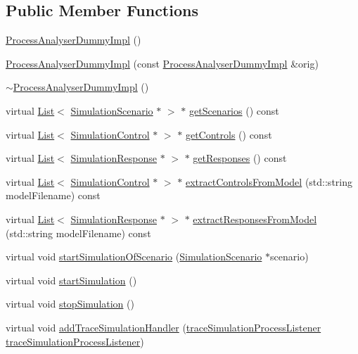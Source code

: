 \subsection*{Public Member Functions}
\begin{DoxyCompactItemize}
\item 
\hyperlink{class_process_analyser_dummy_impl_a5db24b827b7a48066deffe5229b74a32}{Process\+Analyser\+Dummy\+Impl} ()
\item 
\hyperlink{class_process_analyser_dummy_impl_a7157c55cb39b5aaab4c3f00bf3fcc347}{Process\+Analyser\+Dummy\+Impl} (const \hyperlink{class_process_analyser_dummy_impl}{Process\+Analyser\+Dummy\+Impl} \&orig)
\item 
\hyperlink{class_process_analyser_dummy_impl_aea9c62c96a8e1eb12568df16667db33e}{$\sim$\+Process\+Analyser\+Dummy\+Impl} ()
\item 
virtual \hyperlink{class_list}{List}$<$ \hyperlink{class_simulation_scenario}{Simulation\+Scenario} $\ast$ $>$ $\ast$ \hyperlink{class_process_analyser_dummy_impl_a9a91a2a398e58850f53a708a6a9d5fcf}{get\+Scenarios} () const 
\item 
virtual \hyperlink{class_list}{List}$<$ \hyperlink{class_simulation_control}{Simulation\+Control} $\ast$ $>$ $\ast$ \hyperlink{class_process_analyser_dummy_impl_ac1fd3d1c3329056a269594647a8a5d8d}{get\+Controls} () const 
\item 
virtual \hyperlink{class_list}{List}$<$ \hyperlink{class_simulation_response}{Simulation\+Response} $\ast$ $>$ $\ast$ \hyperlink{class_process_analyser_dummy_impl_a2200ea0a092a988ea550ef6c6a2abaef}{get\+Responses} () const 
\item 
virtual \hyperlink{class_list}{List}$<$ \hyperlink{class_simulation_control}{Simulation\+Control} $\ast$ $>$ $\ast$ \hyperlink{class_process_analyser_dummy_impl_ad0d2050ee20f8250312401044a33ef2d}{extract\+Controls\+From\+Model} (std\+::string model\+Filename) const 
\item 
virtual \hyperlink{class_list}{List}$<$ \hyperlink{class_simulation_response}{Simulation\+Response} $\ast$ $>$ $\ast$ \hyperlink{class_process_analyser_dummy_impl_a2e4d0b4779c0c2eb0a563f0f3ba3c8de}{extract\+Responses\+From\+Model} (std\+::string model\+Filename) const 
\item 
virtual void \hyperlink{class_process_analyser_dummy_impl_a6067fc614277fc1322ad41b359121d76}{start\+Simulation\+Of\+Scenario} (\hyperlink{class_simulation_scenario}{Simulation\+Scenario} $\ast$scenario)
\item 
virtual void \hyperlink{class_process_analyser_dummy_impl_a413b820d11725519356ad797cda6913b}{start\+Simulation} ()
\item 
virtual void \hyperlink{class_process_analyser_dummy_impl_a03d62ac02932315ff159c6004681868e}{stop\+Simulation} ()
\item 
virtual void \hyperlink{class_process_analyser_dummy_impl_af78d57b552952bf18490a3e4b57a5efb}{add\+Trace\+Simulation\+Handler} (\hyperlink{_trace_manager_8h_a7ff1963642ecda8c9a76991b351f0385}{trace\+Simulation\+Process\+Listener} \hyperlink{_trace_manager_8h_a7ff1963642ecda8c9a76991b351f0385}{trace\+Simulation\+Process\+Listener})
\end{DoxyCompactItemize}


